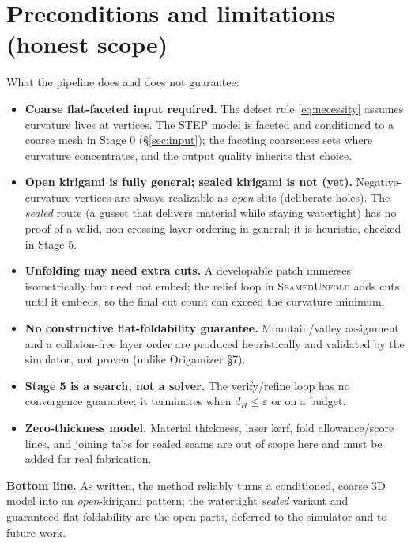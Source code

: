 \documentclass[11pt]{article}
\newcommand{\eps}{\varepsilon}
\begin{document}
\section{Preconditions and limitations (honest scope)}\label{sec:limits}
What the pipeline does and does not guarantee:
\begin{itemize}[leftmargin=1.4em,itemsep=2pt]
  \item \textbf{Coarse flat-faceted input required.} The defect rule
  \eqref{eq:necessity} assumes curvature lives at vertices. The STEP model is
  faceted and conditioned to a coarse mesh in Stage 0 (\S\ref{sec:input});
  the faceting coarseness sets where curvature concentrates, and the output
  quality inherits that choice.
  \item \textbf{Open kirigami is fully general; sealed kirigami is not (yet).}
  Negative-curvature vertices are always realizable as \emph{open} slits
  (deliberate holes). The \emph{sealed} route (a gusset that delivers
  material while staying watertight) has no proof of a valid, non-crossing
  layer ordering in general; it is heuristic, checked in Stage 5.
  \item \textbf{Unfolding may need extra cuts.} A developable patch immerses
  isometrically but need not embed; the relief loop in \textsc{SeamedUnfold}
  adds cuts until it embeds, so the final cut count can exceed the curvature
  minimum.
  \item \textbf{No constructive flat-foldability guarantee.} Mountain/valley
  assignment and a collision-free layer order are produced heuristically and
  validated by the simulator, not proven (unlike Origamizer \S7).
  \item \textbf{Stage 5 is a search, not a solver.} The verify/refine loop
  has no convergence guarantee; it terminates when $d_H\le\eps$ or on a
  budget.
  \item \textbf{Zero-thickness model.} Material thickness, laser kerf, fold
  allowance/score lines, and joining tabs for sealed seams are out of scope
  here and must be added for real fabrication.
\end{itemize}
\noindent\textbf{Bottom line.} As written, the method reliably turns a
conditioned, coarse 3D model into an \emph{open}-kirigami pattern; the
watertight \emph{sealed} variant and guaranteed flat-foldability are the open
parts, deferred to the simulator and to future work.
\end{document}
